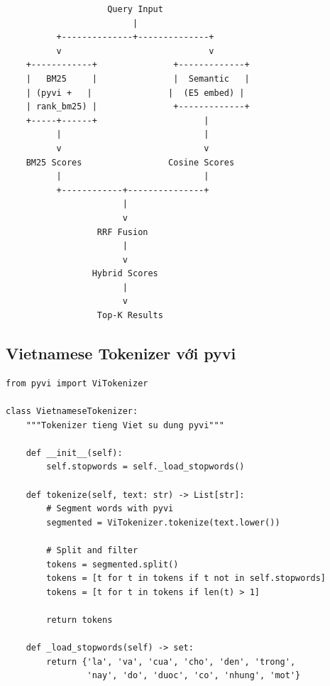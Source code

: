 \documentclass[../DoAn.tex]{subfiles}
\begin{document}
\begin{verbatim}
                    Query Input
                         |
          +--------------+--------------+
          v                             v
    +------------+               +-------------+
    |   BM25     |               |  Semantic   |
    | (pyvi +   |               |  (E5 embed) |
    | rank_bm25) |               +-------------+
    +-----+------+                     |
          |                            |
          v                            v
    BM25 Scores                 Cosine Scores
          |                            |
          +------------+---------------+
                       |
                       v
                  RRF Fusion
                       |
                       v
                 Hybrid Scores
                       |
                       v
                  Top-K Results
\end{verbatim}

\subsection{Vietnamese Tokenizer với pyvi}
\begin{verbatim}
from pyvi import ViTokenizer

class VietnameseTokenizer:
    """Tokenizer tieng Viet su dung pyvi"""
    
    def __init__(self):
        self.stopwords = self._load_stopwords()
    
    def tokenize(self, text: str) -> List[str]:
        # Segment words with pyvi
        segmented = ViTokenizer.tokenize(text.lower())
        
        # Split and filter
        tokens = segmented.split()
        tokens = [t for t in tokens if t not in self.stopwords]
        tokens = [t for t in tokens if len(t) > 1]
        
        return tokens
    
    def _load_stopwords(self) -> set:
        return {'la', 'va', 'cua', 'cho', 'den', 'trong', 
                'nay', 'do', 'duoc', 'co', 'nhung', 'mot'}
\end{verbatim}
\end{document}
